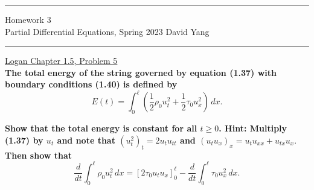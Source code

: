 \documentclass[11pt]{article}
\begin{document}
	\hrule
	\begin{center}
		{\Large Homework 3} \\ %
		\vspace{0.2cm}
		Partial Differential Equations, Spring 2023 \hfill David Yang %
	\end{center}

\hrule

\vspace{1em}

\underline{Logan Chapter 1.5, Problem 5} \\

\textbf{The total energy of the string governed by equation (1.37) with boundary conditions (1.40) is defined by $$E(t) = \int_{0}^{\ell} \left( \frac{1}{2} \rho_0 u_t^2 + \frac{1}{2} \tau_0 u_x^2 \right) \, dx.$$}

\textbf{Show that the total energy is constant for all $ t \geq 0$. Hint: Multiply (1.37) by $u_t$ and note that $(u_t^2)_t = 2u_tu_{tt}$ and $(u_tu_x)_x = u_tu_{xx} + u_{tx}u_x.$ Then
show that $$\frac{d}{dt} \int_{0}^{\ell} \rho_0 u_t^2 \, dx= [2\tau_0u_tu_x]_0^\ell - \frac{d}{dt}  \int_{0}^{\ell} \tau_0 u_x^2 \, dx.$$ }
\end{document}
